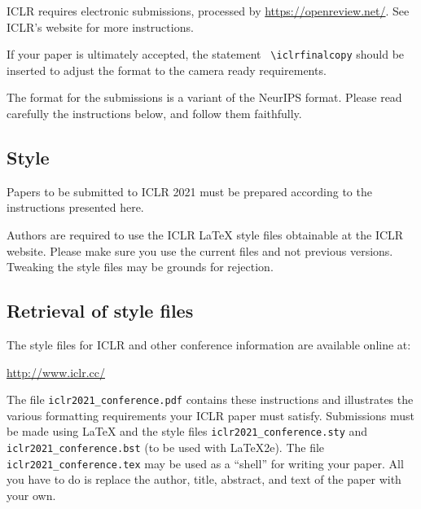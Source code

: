 \documentclass{article} %
\begin{document}






ICLR requires electronic submissions, processed by
\url{https://openreview.net/}. See ICLR's website for more instructions.

If your paper is ultimately accepted, the statement {\tt
  {\textbackslash}iclrfinalcopy} should be inserted to adjust the
format to the camera ready requirements.

The format for the submissions is a variant of the NeurIPS format.
Please read carefully the instructions below, and follow them
faithfully.

\subsection{Style}

Papers to be submitted to ICLR 2021 must be prepared according to the
instructions presented here.


Authors are required to use the ICLR \LaTeX{} style files obtainable at the
ICLR website. Please make sure you use the current files and
not previous versions. Tweaking the style files may be grounds for rejection.

\subsection{Retrieval of style files}

The style files for ICLR and other conference information are available online at:
\begin{center}
   \url{http://www.iclr.cc/}
\end{center}
The file \verb+iclr2021_conference.pdf+ contains these
instructions and illustrates the
various formatting requirements your ICLR paper must satisfy.
Submissions must be made using \LaTeX{} and the style files
\verb+iclr2021_conference.sty+ and \verb+iclr2021_conference.bst+ (to be used with \LaTeX{}2e). The file
\verb+iclr2021_conference.tex+ may be used as a ``shell'' for writing your paper. All you
have to do is replace the author, title, abstract, and text of the paper with
your own.
\end{document}
